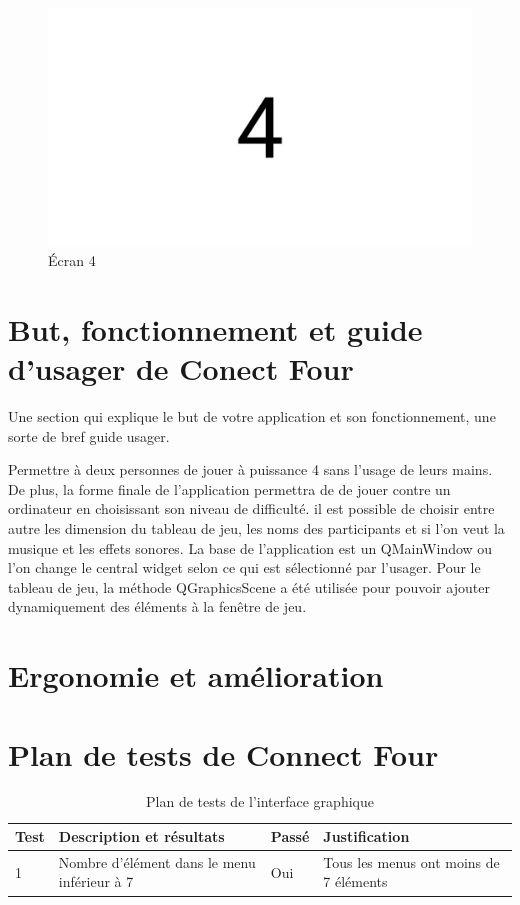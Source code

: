 \begin{figure}[H]
    \centering
    \includegraphics[width=6in]{img/4}
    \caption{Écran 4}
\end{figure}

\section{But, fonctionnement et guide d'usager de Conect Four}

Une section qui explique le but de votre application et son fonctionnement, une sorte de bref guide usager.

Permettre à deux personnes de jouer à puissance 4 sans l’usage de leurs mains.
De plus, la forme finale de l’application permettra de  de jouer contre un ordinateur en choisissant son niveau de difficulté.
il est possible de choisir entre autre les dimension du tableau de jeu, les noms des participants et si l’on veut la musique et les effets sonores.
La base de l’application est un QMainWindow ou l’on change le central widget selon ce qui est sélectionné par l’usager.
Pour le tableau de jeu, la méthode QGraphicsScene a été utilisée pour pouvoir ajouter dynamiquement des éléments à la fenêtre de jeu.

\section{Ergonomie et amélioration}

\section{Plan de tests de Connect Four}

\begin{table}[H]
    \centering
    \caption{Plan de tests de l'interface graphique}
    \begin{tabular}{p{0.25in}p{2.5in}p{0.5in}p{2.5in}}
        \hline
        \bfseries Test & \bfseries Description et résultats & \bfseries Passé & \bfseries Justification \\
        \hline\hline
        1 & Nombre d'élément dans le menu inférieur à 7 & Oui & Tous les menus ont moins de 7 éléments \\
        \hline
    \end{tabular}
\end{table}

